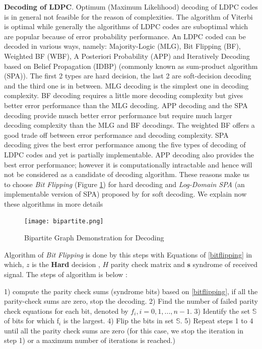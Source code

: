 \textbf{Decoding of LDPC}. Optimum (Maximum Likelihood) decoding of LDPC codes is in general not feasible for the reason of complexities. The algorithm of Viterbi is optimal while generally the algorithms of LDPC codes are suboptimal which are popular because of error probability performance. An LDPC coded can be decoded in various ways, namely: Majority-Logic (MLG), Bit Flipping (BF), Weighted BF (WBF), A Posteriori Probability (APP) and Iteratively Decoding based on Belief Propagation (IDBP) (commonly known as sum-product algorithm (SPA)). The first 2 types are hard decision, the last 2 are soft-decision decoding and the third one is in between. MLG decoding is the simplest one in decoding complexity. BF decoding requires a little more decoding complexity but gives better error performance than the MLG decoding. APP decoding and the SPA decoding provide musch better error performance but require much larger decoding complexity than the MLG and BF decodings. The weighted BF offers a good trade off between error performance and decoding complexity. SPA decoding gives the best error performance among the five types of decoding of LDPC codes and yet is partially implementable. APP decoding also provides the best error performance; however it is computationally intractable and hence will not be considered as a candidate of decoding algorithm\cite{errorcontrolcoding}. These reasons make us to choose \textit{Bit Flipping} (Figure \ref{bipartite}) for hard decoding and \textit{Log-Domain SPA} (an implementable version of SPA) proposed by \cite{logdomain} for soft decoding. We explain now these algorithms in more details

%
\begin{figure}[htbp]
\centering
\texttt{[image: bipartite.png]}
\caption[Bipartite Graph Demonstration for Decoding]{Bipartite Graph Demonstration for Decoding}
\label{bipartite}
\end{figure}

%
Algorithm of \textit{Bit Flipping} is done by this steps with Equations of \ref{bitflipping} in which, $z$ is the \textbf{Hard} decision , $H$ parity check matrix and $\textbf{s}$ syndrome of received signal. The steps of algorithm is below :

1) compute the parity check sums (syndrome bits) based on \ref{bitflipping}, if all the parity-check sums are zero, stop the decoding. 2) Find the number of failed parity check equations for each bit, denoted by $f_{i}, i =0,1,..., n-1$. 3) Identify the set $\mathbb{S}$ of bits for which f$_{i}$ is the largest. 4) Flip the bits in set $\mathbb{S}$. 5) Repeat steps 1 to 4 until all the parity check sums are zero (for this case, we stop the iteration in step 1) or a maximum number of iterations is reached.)


